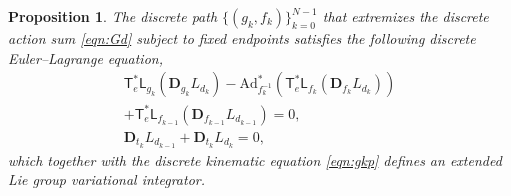 \documentclass[letterpaper, 10pt, conference]{ieeeconf}
\newcommand{\T}{\ensuremath{\mathsf{T}}}
\renewcommand{\L}{\ensuremath{\mathsf{L}}}
\newcommand{\D}{\ensuremath{\mathbf{D}}}
\newcommand{\Ad}{\ensuremath{\mathrm{Ad}}}
\newtheorem{prop}{Proposition}
\begin{document}
\begin{prop}
    The discrete path $\{(g_k,f_k)\}_{k=0}^{N-1}$ that extremizes the discrete action sum \eqref{eqn:Gd} subject to fixed endpoints satisfies the following discrete Euler--Lagrange equation,
    \begin{gather}
        \T^*_e\L_{g_k}(\D_{g_k} L_{d_k})- \Ad^*_{f_k^{-1}} (\T^*_e\L_{f_k}(\D_{f_k} L_{d_k}))\nonumber \\
        + \T^*_e\L_{f_{k-1}}(\D_{f_{k-1}} L_{d_{k-1}}) =0,\label{eqn:DEL}\\
        \D_{t_k} L_{d_{k-1}} + \D_{t_k} L_{d_k} = 0, \label{eqn:DELt}
    \end{gather}
    which together with the discrete kinematic equation \eqref{eqn:gkp} defines an extended Lie group variational integrator.
\end{prop}
\end{document}
